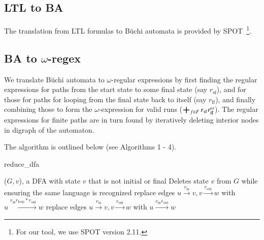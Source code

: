 \documentclass[preprint,12pt]{elsarticle}
\theoremstyle{definition}
\theoremstyle{remark}
\DeclareMathOperator*{\bigplus}{\scalerel*{+}{\sum}}
\newcommand{\Buchi}{B\"{u}chi }
\begin{document}
\subsection{LTL to BA} \label{ltl2aut}
The translation from LTL formulas to \Buchi automata is provided by SPOT~\cite{Dur22}\footnote{For our tool, we use SPOT version 2.11.}.

\subsection{BA to $\omega$-regex} \label{aut2regex}
We translate \Buchi automata to $\omega$-regular expressions by first finding the regular expressions for paths from the start state to some final state (say $r_\mathrm{sf}$), and for those for paths for looping from the final state back to itself (say $r_\mathrm{ff}$), and finally combining those to form the $\omega$-expression for valid runs ($\bigplus_{f\in F} r_\mathrm{sf}r_\mathrm{ff}^\omega$). The regular expressions for finite paths are in turn found by iteratively deleting interior nodes in digraph of the automaton.

The algorithm is outlined below (see Algorithms 1 - 4). %

\begin{algorithm}[h!]
    \caption{reduce\_dfa}
    \begin{algorithmic}
        \Require ($G, v$), a DFA with state $v$ that is not initial or final
        \Ensure Deletes state $v$ from $G$ while ensuring the same language is recognized
                \State replace edges $u\xrightarrow{r_\mathrm{in}} v, v \xrightarrow{r_\mathrm{out}} w$ with $u \xrightarrow{r_\mathrm{in} r_\mathrm{loop}* r_\mathrm{out}} w$
            \Else
                \State replace edges $u\xrightarrow{r_\mathrm{in}} v, v \xrightarrow{r_\mathrm{out}} w$ with $u \xrightarrow{r_\mathrm{in}  r_\mathrm{out}} w$
            \EndIf
        \EndFor
    \end{algorithmic}
\end{algorithm}
\end{document}
